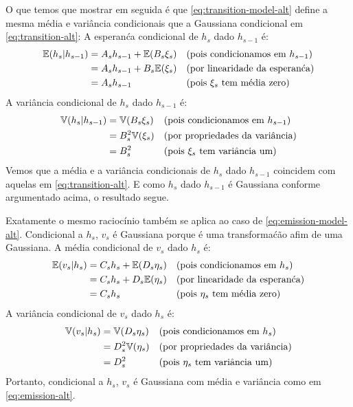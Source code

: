 \begin{exenumerate}
\begin{solution}
        O que temos que mostrar em seguida \'e que \eqref{eq:transition-model-alt} define
        a mesma m\'edia e vari\^ancia condicionais que a Gaussiana condicional em
        \eqref{eq:transition-alt}: A esperan\'ca condicional de $h_s$ dado
        $h_{s-1}$ \'e:
        \begin{align}
            \mathbb{E}(h_s | h_{s-1}) & = A_s h_{s-1} + \mathbb{E}( B_s \xi_s) &&\text{(pois condicionamos em $h_{s-1}$)}\\
            & = A_s h_{s-1} + B_s \mathbb{E}(\xi_s) && \text{(por linearidade da esperan\'ca)}\\
            & = A_s h_{s-1} && \text{(pois $\xi_s$ tem m\'edia zero)}
        \end{align}
        A vari\^ancia condicional de $h_s$ dado $h_{s-1}$ \'e:
        \begin{align}
            \mathbb{V}(h_s | h_{s-1}) & =  \mathbb{V}( B_s \xi_s) &&\text{(pois condicionamos em $h_{s-1}$)}\\
            & = B_s^2 \mathbb{V}(\xi_s) && \text{(por propriedades da vari\^ancia)}\\
            & = B_s^2 && \text{(pois $\xi_s$ tem vari\^ancia um)}
        \end{align}
        Vemos que a m\'edia e a vari\^ancia condicionais de $h_s$ dado $h_{s-1}$ coincidem com aquelas em
        \eqref{eq:transition-alt}. E como $h_s$ dado $h_{s-1}$ \'e Gaussiana conforme argumentado acima,
        o resultado segue.
        
        Exatamente o mesmo racioc\'inio tamb\'em se aplica ao caso de
        \eqref{eq:emission-model-alt}. Condicional a $h_s$, $v_s$ \'e Gaussiana
        porque \'e uma transforma\'c\~ao afim de uma Gaussiana. A m\'edia condicional de $v_s$ dado $h_s$ \'e:
        \begin{align}
            \mathbb{E}(v_s | h_s) & = C_s h_s + \mathbb{E}( D_s \eta_s) &&\text{(pois condicionamos em $h_s$)}\\
            & = C_s h_s + D_s \mathbb{E}(\eta_s) && \text{(por linearidade da esperan\'ca)}\\
            & = C_s h_s && \text{(pois $\eta_s$ tem m\'edia zero)}
        \end{align}
        A vari\^ancia condicional de $v_s$ dado $h_s$ \'e:
        \begin{align}
            \mathbb{V}(v_s | h_s) & =  \mathbb{V}( D_s \eta_s) &&\text{(pois condicionamos em $h_s$)}\\
            & = D_s^2 \mathbb{V}(\eta_s) && \text{(por propriedades da vari\^ancia)}\\
            & = D_s^2 && \text{(pois $\eta_s$ tem vari\^ancia um)}
        \end{align}
        Portanto, condicional a $h_s$, $v_s$ \'e Gaussiana com m\'edia e vari\^ancia como em \eqref{eq:emission-alt}.
        

\end{solution}
\end{exenumerate}
